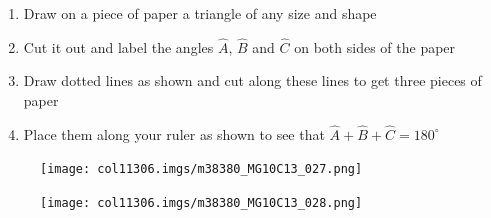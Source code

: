 \begin{table}[H]
          \label{m38380*id317720}\begin{enumerate}[noitemsep, label=\textbf{\arabic*}. ] 
            \label{m38380*uid41}\item Draw on a piece of paper a triangle of any size and shape
\label{m38380*uid42}\item Cut it out and label the angles \begin{math}\hat{A}\end{math}, \begin{math}\hat{B}\end{math} and \begin{math}\hat{C}\end{math} on both sides of the paper
\label{m38380*uid43}\item Draw dotted lines as shown and cut along these lines to get three pieces of paper
\label{m38380*uid44}\item Place them along your ruler as shown to see that \begin{math}\hat{A}+\hat{B}+\hat{C}={180}^{\circ }\end{math}\end{enumerate}
        
          \label{m38380*id317868}
    \setcounter{subfigure}{0}


	\begin{figure}[H] %
    \begin{center}
    \label{m38380*id317874!!!underscore!!!media}\label{m38380*id317874!!!underscore!!!printimage}\texttt{[image: col11306.imgs/m38380\_MG10C13\_027.png]} %
        
      \vspace{2pt}
    \vspace{.1in}
    
    \end{center}

 \end{figure}   

    \addtocounter{footnote}{-0}
    
    \setcounter{subfigure}{0}


	\begin{figure}[H] %
    \begin{center}
    \label{m38380*id317886!!!underscore!!!media}\label{m38380*id317886!!!underscore!!!printimage}\texttt{[image: col11306.imgs/m38380\_MG10C13\_028.png]} %
        

\end{center}
\end{figure}
\end{table}
